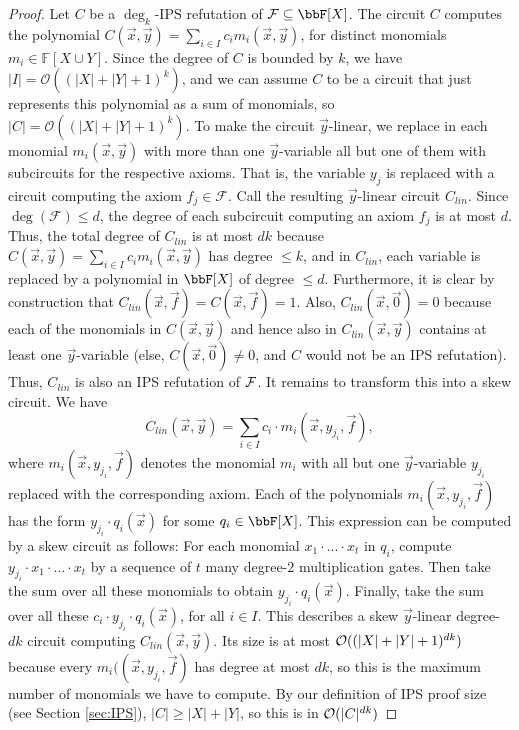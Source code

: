 \documentclass[10pt,a4paper]{article}
\newcommand{\IPS}{\mathrm{IPS}}
\newcommand{\Ff}{{\cal F}}
\newcommand{\Oo}{{\cal O}}
\newcommand{\BigO}{\ensuremath{\mathcal{O}}}
\newcommand{\Field}{\ensuremath{\mathbb{F}}}
\newcommand{\F}{\ensuremath{\mathcal{F}}}
\begin{document}
\begin{proof}
	Let $C$ be a $\deg_k$-$\IPS$ refutation of $\F \subseteq \bbF[X]$.
	The circuit $C$ computes the polynomial
	$C(\vec x,\vec y) = \sum_{i\in I} c_im_i(\vec x,\vec y)$,
	for distinct monomials $m_i \in \Field[X \cup Y]$. Since the degree of
	$C$ is bounded by $k$, we have $|I|= \BigO((|X| + |Y|+1)^{k})$, and we can assume $C$ to be a circuit that just represents this polynomial as a sum of monomials, so $|C| = \BigO((|X| + |Y|+1)^{k})$.
	To make the circuit $\vec y$-linear, we replace in each monomial $m_i(\vec x, \vec y)$ with more than one $\vec y$-variable all but one of them with subcircuits for the respective axioms. That is, the variable $y_j$ is replaced with a circuit computing the axiom $f_j \in \F$. Call the resulting $\vec y$-linear
	circuit $C_{lin}$. Since $\deg(\F) \leq d$, the degree of each subcircuit computing an axiom $f_j$ is at most $d$. Thus, the total degree of $C_{lin}$ is at most $dk$ because $C(\vec x,\vec y) = \sum_{i\in I} c_im_i(\vec x,\vec y)$ has degree $\leq k$, and in $C_{lin}$, each variable is replaced by a polynomial in $\bbF[X]$ of degree $\leq d$. Furthermore, it is clear by construction that $C_{lin}(\vec x, \vec f) = C(\vec x, \vec f) = 1$. Also, $C_{lin}(\vec x, \vec 0) = 0$ because each of the monomials in $C(\vec x, \vec y)$ and hence also in $C_{lin}(\vec x, \vec y)$ contains at least one $\vec y$-variable (else, $C(\vec x, \vec 0) \neq 0$, and $C$ would not be an IPS refutation). Thus, $C_{lin}$ is also an IPS refutation of $\Ff$. It remains to transform this into a skew circuit. We have
	\[
	C_{lin}(\vec x,\vec y) = \sum_{i\in I} c_i \cdot m_i(\vec x,y_{j_i},\vec f),
	\]
	where $m_i(\vec x,y_{j_i},\vec f)$ denotes the monomial $m_i$ with all but one $\vec y$-variable $y_{j_i}$ replaced with the corresponding axiom. Each of the polynomials $m_i(\vec x,y_{j_i},\vec f)$ has the form $y_{j_i} \cdot q_i(\vec x)$ for some $q_i \in \bbF[X]$. This expression can be computed by a skew circuit as follows: For each monomial $x_{1} \cdot ...  \cdot x_t$ in $q_i$, compute $y_{j_i} \cdot x_{1} \cdot ...  \cdot x_t$ by a sequence of $t$ many degree-$2$ multiplication gates. Then take the sum over all these monomials to obtain $y_{j_i} \cdot q_i(\vec x)$. Finally, take the sum over all these $c_i \cdot y_{j_i} \cdot q_i(\vec x)$, for all $i \in I$. This describes a skew $\vec y$-linear degree-$dk$ circuit computing $C_{lin}(\vec x,\vec y)$. Its size is at most $\Oo((|X| + |Y|+1)^{dk})$ because every $m_i((\vec x,y_{j_i},\vec f)$ has degree at most $dk$, so this is the maximum number of monomials we have to compute.
	By our definition of IPS proof size (see Section \ref{sec:IPS}), $|C| \geq |X| + |Y|$, so this is in $\Oo(|C|^{dk})$
\end{proof}	
\end{document}
